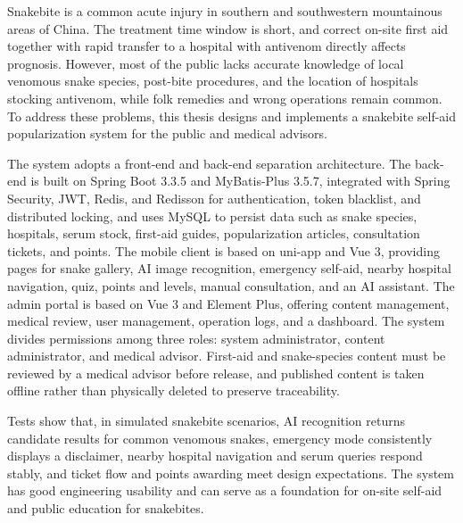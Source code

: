\documentclass[12pt, a4paper, oneside]{ctexrep}
\begin{document}
{\rmfamily{}\fontsize{12pt}{20pt}\selectfont\parindent=0pt\parskip=0pt
\noindent\hspace*{2em}Snakebite is a common acute injury in southern and southwestern mountainous areas of China. The treatment time window is short, and correct on-site first aid together with rapid transfer to a hospital with antivenom directly affects prognosis. However, most of the public lacks accurate knowledge of local venomous snake species, post-bite procedures, and the location of hospitals stocking antivenom, while folk remedies and wrong operations remain common. To address these problems, this thesis designs and implements a snakebite self-aid popularization system for the public and medical advisors.\par
\noindent\hspace*{2em}The system adopts a front-end and back-end separation architecture. The back-end is built on Spring Boot 3.3.5 and MyBatis-Plus 3.5.7, integrated with Spring Security, JWT, Redis, and Redisson for authentication, token blacklist, and distributed locking, and uses MySQL to persist data such as snake species, hospitals, serum stock, first-aid guides, popularization articles, consultation tickets, and points. The mobile client is based on uni-app and Vue 3, providing pages for snake gallery, AI image recognition, emergency self-aid, nearby hospital navigation, quiz, points and levels, manual consultation, and an AI assistant. The admin portal is based on Vue 3 and Element Plus, offering content management, medical review, user management, operation logs, and a dashboard. The system divides permissions among three roles: system administrator, content administrator, and medical advisor. First-aid and snake-species content must be reviewed by a medical advisor before release, and published content is taken offline rather than physically deleted to preserve traceability.
}
\par
{\rmfamily{}\fontsize{12pt}{20pt}\selectfont\parindent=0pt\parskip=0pt
\noindent\hspace*{2em}Tests show that, in simulated snakebite scenarios, AI recognition returns candidate results for common venomous snakes, emergency mode consistently displays a disclaimer, nearby hospital navigation and serum queries respond stably, and ticket flow and points awarding meet design expectations. The system has good engineering usability and can serve as a foundation for on-site self-aid and public education for snakebites.
}

\vspace{1em}
\end{document}

